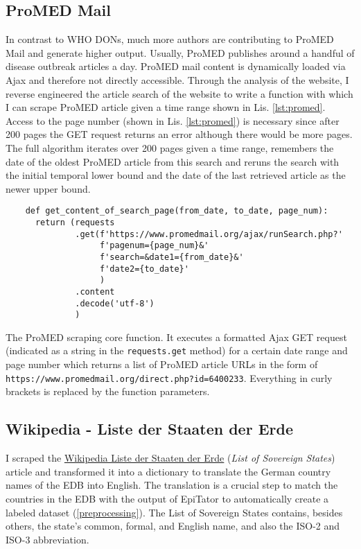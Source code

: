 \subsection{ProMED Mail}
  In contrast to WHO DONs, much more authors are contributing to ProMED Mail and generate higher output.
  Usually, ProMED publishes around a handful of disease outbreak articles a day.
  ProMED mail content is dynamically loaded via Ajax and therefore not directly accessible.
  Through the analysis of the website, I reverse engineered the article search of the website to write a function with which I can scrape ProMED article given a time range shown in Lis. \ref{lst:promed}.
  Access to the page number (shown in Lis. \ref{lst:promed}) is necessary since after 200 pages the GET request returns an error although there would be more pages.
  The full algorithm iterates over 200 pages given a time range, remembers the date of the oldest ProMED article from this search and reruns the search with the initial temporal lower bound and the date of the last retrieved article as the newer upper bound.

  \begin{listing}[h!]
    \begin{verbatim}
    def get_content_of_search_page(from_date, to_date, page_num):
      return (requests
              .get(f'https://www.promedmail.org/ajax/runSearch.php?'
                   f'pagenum={page_num}&'
                   f'search=&date1={from_date}&'
                   f'date2={to_date}'
                   )
              .content
              .decode('utf-8')
              )
    \end{verbatim}
    \caption{The ProMED scraping core function. It executes a formatted Ajax GET request (indicated as a string in the \texttt{requests.get} method) for a certain date range and page number which returns a list of ProMED article URLs in the form of \textquotesingle \texttt{https://www.promedmail.org/direct.php?id=6400233}\textquotesingle. Everything in curly brackets is replaced by the function parameters.}
    \label{lst:promed}
  \end{listing}

\subsection{Wikipedia - Liste der Staaten der Erde}\label{wikipedia}
  I scraped the \href{https://de.wikipedia.org/wiki/Liste_der_Staaten_der_Erde}{Wikipedia Liste der Staaten der Erde} (\textit{List of Sovereign States}) article and transformed it into a dictionary to translate the German country names of the EDB into English.
  The translation is a crucial step to match the countries in the EDB with the output of EpiTator to automatically create a labeled dataset (\ref{preprocessing}).
  The List of Sovereign States contains, besides others, the state's common, formal, and English name, and also the ISO-2 and ISO-3 abbreviation.

